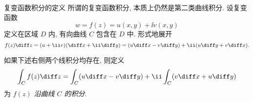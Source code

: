 \begin{frame}{复变函数积分的定义}
	\onslide<+->
	所谓的复变函数积分, 本质上仍然是第二类曲线积分.
	\onslide<+->
	设复变函数
	\[
		w=f(z)=u(x,y)+\ii v(x,y)
	
	\]
	定义在区域 $D$ 内, 有向曲线 $C$ 包含在 $D$ 中.
	\onslide<+->
	形式地展开
	\[
		f(z)\diff z=(u+\ii v)(\diff x+\ii\diff y)=(u\diff x-v\diff y)+\ii(u\diff y+v\diff x).
	
	\]
	\vspace{-\baselineskip}
	\onslide<+->
	\begin{definition}
		如果下述右侧两个线积分均存在, 则定义
	\[
			\int_C f(z)\diff z=\int_C(u\diff x-v\diff y)+\ii\int_C(v\diff x+u\diff y)
	\]
		为 \emph{$f(z)$ 沿曲线 $C$ 的积分}.
	\end{definition}
\end{frame}


